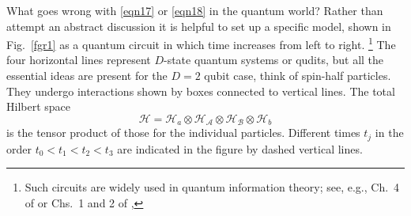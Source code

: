 \documentclass[12pt]{article} %
\newcommand{\ot}{\otimes }
\newcommand{\AM}{{\mathcal A}}
\newcommand{\BM}{{\mathcal B}}
\newcommand{\HM}{{\mathcal H}}
\begin{document}
What goes wrong with \eqref{eqn17} or \eqref{eqn18} in the quantum world?
Rather than attempt an abstract discussion it is helpful to set up a specific
model, shown in Fig.~\ref{fgr1} as a quantum circuit in which time increases
from left to right.%
\footnote{Such circuits are widely used in quantum information theory; see,
  e.g., Ch.~4 of \cite{NlCh00} or Chs.~1 and 2 of \cite{Mrmn07},} %
The four horizontal lines represent $D$-state
quantum systems or qudits, but all the essential ideas are present for the
$D=2$ qubit case, think of spin-half particles.  They undergo interactions
shown by boxes connected to vertical lines.  The total
Hilbert space
\begin{equation}
  \HM = \HM_a \ot\HM_\AM \ot\HM_\BM \ot\HM_b 
\label{eqn23}
\end{equation}
is the tensor product of those for the individual particles. Different times
$t_j$ in the order $t_0 < t_1 < t_2 < t_3$ are indicated in the figure by
dashed vertical lines.
\end{document}
